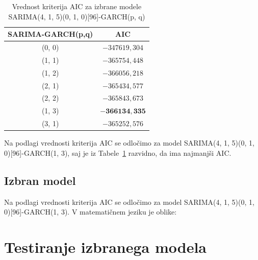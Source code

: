 \documentclass[a4paper, 11pt]{article}
\begin{document}
\begin{table}[!ht]
    \centering
    \caption{Vrednost kriterija AIC za izbrane modele SARIMA(4, 1, 5)(0, 1, 0)[96]-GARCH(p, q)}\par\medskip
    \label{Tab:GARCH_AIC}
    \begin{tabular}{c|c}
        SARIMA-GARCH(p,q) & AIC \\ \hline
        (0, 0) & $-347619{,}304$ \\ 
        (1, 1) & $-365754{,}448$ \\ 
        (1, 2) & $-366056{,}218$ \\ 
        (2, 1) & $-365434{,}577$ \\ 
        (2, 2) & $-365843{,}673$ \\ 
        (1, 3) & $\mathbf{-366134{,}335}$ \\ 
        (3, 1) & $-365252{,}576$ \\ 
    \end{tabular}
\end{table}

\noindent Na podlagi vrednosti kriterija AIC se odločimo za model SARIMA(4, 1, 5)(0, 1, 0)[96]-GARCH(1, 3), saj
je iz Tabele~\ref{Tab:GARCH_AIC} razvidno, da ima najmanjši AIC. 


\subsection{Izbran model}

Na podlagi vrednosti kriterija AIC se odločimo za model SARIMA(4, 1, 5)(0, 1, 0)[96]-GARCH(1, 3). 
V matematičnem jeziku je oblike:




\section{Testiranje izbranega modela}
\end{document}
